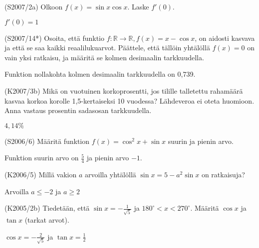 \begin{tehtava} (S2007/2a)
	Olkoon $f(x)=\sin x\cos x$. Laske $f'(0)$.
		\begin{vastaus}
			$f'(0)=1$
		\end{vastaus}
\end{tehtava}

\begin{tehtava} (S2007/14*)
	Osoita, että funktio $f \colon \mathbb{R}\to\mathbb{R}, f(x)=x-\cos x$, on aidosti kasvava ja 
	että se saa kaikki reaalilukuarvot. Päättele, että tällöin yhtälöllä $f(x)=0$ on vain yksi 
	ratkaisu, ja määritä se kolmen desimaalin tarkkuudella.
		\begin{vastaus}
			Funktion nollakohta kolmen desimaalin tarkkuudella on 0,739.
		\end{vastaus}
\end{tehtava}

\begin{tehtava} (K2007/3b)
	Mikä on vuotuinen korkoprosentti, jos tilille talletettu rahamäärä kasvaa korkoa korolle 
	1,5-kertaiseksi 10 vuodessa? Lähdeveroa ei oteta huomioon. Anna vastaus prosentin sadasosan 
	tarkkuudella.
		\begin{vastaus}
			$4,14\%$
		\end{vastaus}
\end{tehtava}

\begin{tehtava} (S2006/6)
	Määritä funktion $f(x)=\cos^2x+\sin x$ suurin ja pienin arvo.
		\begin{vastaus}
			Funktion suurin arvo on $\frac{5}{4}$ ja pienin arvo $-1$.
		\end{vastaus}
\end{tehtava}

\begin{tehtava} (K2006/5)
	Millä vakion $a$ arvoilla yhtälöllä $\sin x=5-a^2\sin x$ on ratkaisuja?
		\begin{vastaus}
			Arvoilla $a\leq-2$ ja $a\geq2$
		\end{vastaus}
\end{tehtava}

\begin{tehtava} (K2005/2b)
	Tiedetään, että $\sin x=-\frac{1}{\sqrt{5}}$ ja $180^{\circ}<x<270^{\circ}$. Määritä $\cos x$ 
	ja $\tan x$ (tarkat arvot).
		\begin{vastaus}
			$\cos x=-\frac{2}{\sqrt{5}}$ \; ja \; $\tan x=\frac{1}{2}$
		\end{vastaus}
\end{tehtava}

